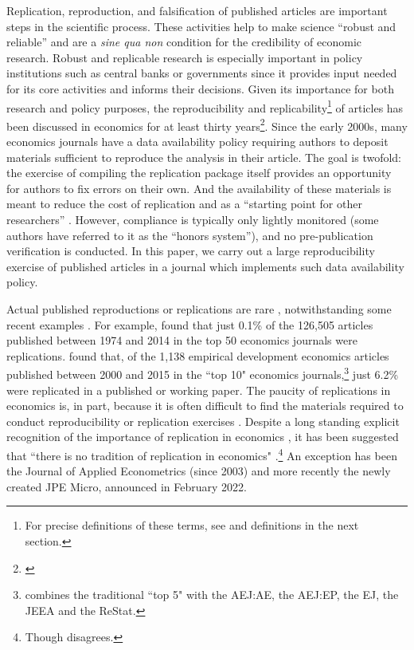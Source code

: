 Replication, reproduction, and falsification of published articles are important steps in the scientific process. These activities help to make science ``robust and reliable'' \parencite{Bollen2015-vb} and are a \textit{sine qua non} condition for the credibility of economic research. Robust and replicable research is especially important in policy institutions such as central banks or governments since it provides input needed for its core activities and informs their decisions. Given its importance for both research and policy purposes, the reproducibility and replicability\footnote{For precise definitions of these terms, see \parencite{Bollen2015-vb,nasem2019} and definitions in the next section.} of articles has been discussed in economics for at least thirty years\footnote{\textcite{Dewald1986,Vinod2005,AndersonEtAl2005,King95,BurmanEtAl2010,Duvendack2017,Hamermesh2017,Sukhtankar2017,Hoeffler2017,Coffman2017,Chang2017,Berry2017,Anderson2017}}. Since the early 2000s, many economics journals have a data availability policy requiring authors to deposit materials sufficient to reproduce the analysis in their article. The goal is twofold: the exercise of compiling the replication package itself provides an opportunity for authors to fix errors on their own. And the availability of these materials is meant to reduce the cost of replication and as a ``starting point for other researchers'' \citep{bernanke2004}. However, compliance is typically only lightly monitored (some authors have referred to it as the ``honors system''), and no pre-publication verification is conducted. In this paper, we carry out a large reproducibility exercise of published articles in a journal which implements such data availability policy.

Actual published reproductions or replications are rare \parencite{BellMiller2013b,Duvendack2017}, notwithstanding some recent examples \parencite{Hoeffler2017a,Chang2017,ChangLi2015,camerer2016}. For example, \textcite{MuellerLanger18} found that just 0.1\% of the 126,505 articles published between 1974 and 2014 in the top 50 economics journals were replications. \textcite{sukhtankar17} found that, of the 1,138 empirical development economics articles published between 2000 and 2015 in the ``top 10" economics journals,\footnote{\textcite{sukhtankar17} combines the traditional ``top 5" with the \ac{AEJ:AE}, the \ac{AEJ:EP}, the \ac{EJ}, the \ac{JEEA} and the \ac{ReStat}.} just 6.2\% were replicated in a published or working paper. The paucity of replications in economics is, in part, because it is often difficult to find the materials required to conduct reproducibility or replication exercises \parencite{Dewald1986,McCullough2006,McCullough03}. Despite a long standing explicit recognition of the importance of replication in economics \parencite{Frisch1933}, it has been suggested that ``there is no tradition of replication in economics" \parencite[p. 1093]{McCullough2006}.\footnote{Though \textcite{Hamermesh2007,Hamermesh2017} disagrees.} An exception has been the Journal of Applied Econometrics (since 2003) and more recently the newly created \ac{JPE} Micro, announced in February 2022.


